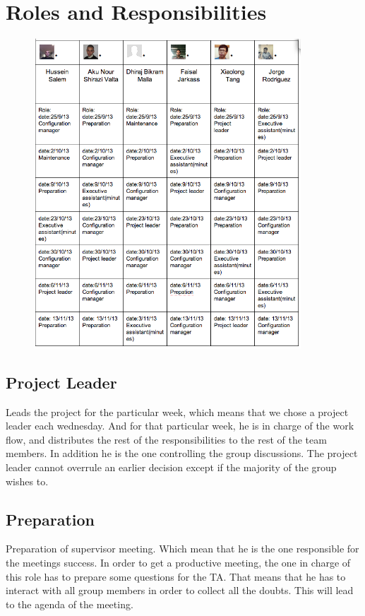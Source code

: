 \section*{Roles and Responsibilities}


\begin{figure}[ht!]
\centering
\includegraphics[width=100mm]{graphics/roles.png}
\label{roles}
\end{figure}



\subsection*{Project Leader}
Leads the project for the particular week, which means that we chose a project leader each wednesday. And for that particular week, he is in charge of the work flow, and distributes the rest of the responsibilities to the rest of the team members. In addition he is the one controlling the group discussions. The project leader cannot overrule an earlier decision except if the majority of the group wishes to.


\subsection*{Preparation}
Preparation of supervisor meeting. Which mean that he is the one responsible for the meetings success. In order to get a productive meeting, the one in charge of this role has to prepare some questions for the TA. That means that he has to interact with all group members in order to collect all the doubts. This will lead to the agenda of the meeting.


